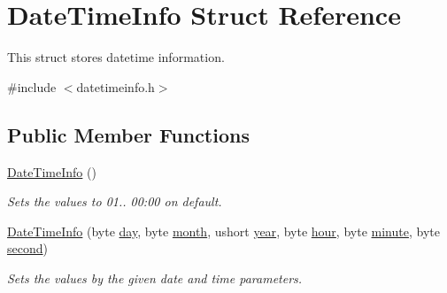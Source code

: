 \hypertarget{struct_date_time_info}{}\section{Date\+Time\+Info Struct Reference}
\label{struct_date_time_info}


This struct stores datetime information.  




{\ttfamily \#include $<$datetimeinfo.\+h$>$}

\subsection*{Public Member Functions}
\begin{DoxyCompactItemize}
\item 
\mbox{\label{struct_date_time_info_a58c8b9442516691a166b0a211b9bed9e}} 
\mbox{\hyperlink{struct_date_time_info_a58c8b9442516691a166b0a211b9bed9e}{Date\+Time\+Info}} ()
\begin{DoxyCompactList}\small\item\em Sets the values to 01.. 00\+:00 on default. \end{DoxyCompactList}\item 
\mbox{\hyperlink{struct_date_time_info_a435a39ef9ed570002b749682b56a3488}{Date\+Time\+Info}} (byte \mbox{\hyperlink{struct_date_time_info_a4ff9b3484f1fa18a4817950b728e70b8}{day}}, byte \mbox{\hyperlink{struct_date_time_info_a3109dfcfba10cf250aef5c9cee9a2567}{month}}, ushort \mbox{\hyperlink{struct_date_time_info_aa443b266afa7ee36f2b830bb6eeb7582}{year}}, byte \mbox{\hyperlink{struct_date_time_info_a0a39e126f724ba5eec16a05b00b68a30}{hour}}, byte \mbox{\hyperlink{struct_date_time_info_a9cf861937714a5b34d7bf574e0c33636}{minute}}, byte \mbox{\hyperlink{struct_date_time_info_a768d1180a0b5d2fca5a8cc5cce822a5e}{second}})
\begin{DoxyCompactList}\small\item\em Sets the values by the given date and time parameters. \end{DoxyCompactList}\end{DoxyCompactItemize}
